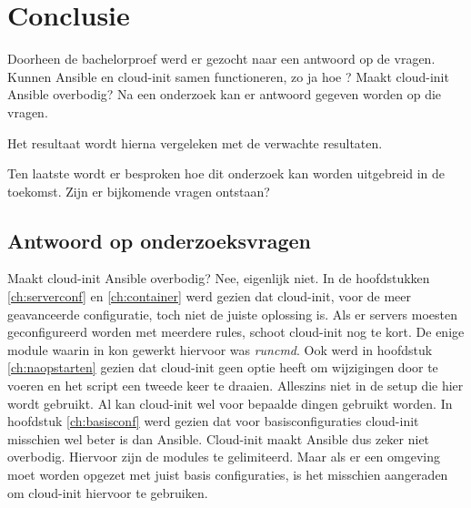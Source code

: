 
\chapter{Conclusie}
\label{ch:conclusie}


Doorheen de bachelorproef werd er gezocht naar een antwoord op de vragen. Kunnen Ansible en cloud-init samen functioneren, zo ja hoe ? Maakt cloud-init Ansible overbodig? Na een onderzoek kan er antwoord gegeven worden op die vragen. 

Het resultaat wordt hierna vergeleken met de verwachte resultaten. 

Ten laatste wordt er besproken hoe dit onderzoek kan worden uitgebreid in de toekomst. Zijn er bijkomende vragen ontstaan?

\section{Antwoord op onderzoeksvragen}
Maakt cloud-init Ansible overbodig? Nee, eigenlijk niet. In de hoofdstukken \ref{ch:serverconf} en \ref{ch:container} werd gezien dat cloud-init, voor de meer geavanceerde configuratie, toch niet de juiste oplossing is. Als er servers moesten geconfigureerd worden met meerdere rules, schoot cloud-init nog te kort. De enige module waarin in kon gewerkt hiervoor was \textit{runcmd}. Ook werd in hoofdstuk \ref{ch:naopstarten} gezien dat cloud-init geen optie heeft om wijzigingen door te voeren en het script een tweede keer te draaien. Alleszins niet in de setup die hier wordt gebruikt. Al kan cloud-init wel voor bepaalde dingen gebruikt worden. In hoofdstuk \ref{ch:basisconf} werd gezien dat voor basisconfiguraties cloud-init misschien wel beter is dan Ansible. Cloud-init maakt Ansible dus zeker niet overbodig. Hiervoor zijn de modules te gelimiteerd. Maar als er een omgeving moet worden opgezet met juist basis configuraties, is het misschien aangeraden om cloud-init hiervoor te gebruiken.

